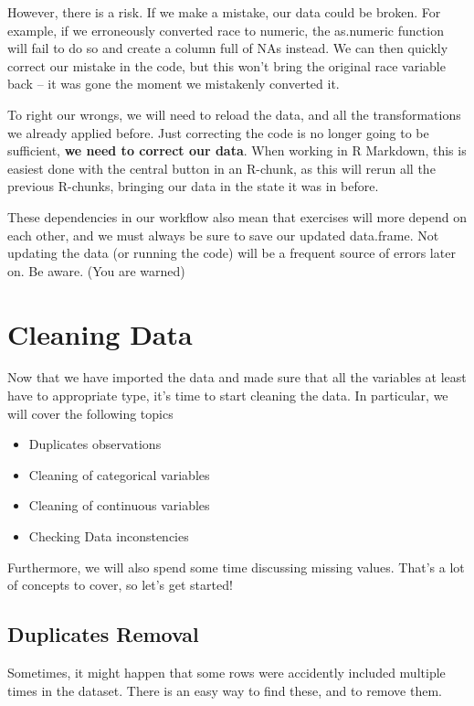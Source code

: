 \documentclass[]{tufte-book}
\providecommand{\tightlist}{%
  \setlength{\itemsep}{0pt}\setlength{\parskip}{0pt}}
\begin{document}
However, there is a risk. If we make a mistake, our data could be
broken. For example, if we erroneously converted race to numeric, the
as.numeric function will fail to do so and create a column full of NAs
instead. We can then quickly correct our mistake in the code, but this
won't bring the original race variable back -- it was gone the moment we
mistakenly converted it.

To right our wrongs, we will need to reload the data, and all the
transformations we already applied before. Just correcting the code is
no longer going to be sufficient, \textbf{we need to correct our data}.
When working in R Markdown, this is easiest done with the central button
in an R-chunk, as this will rerun all the previous R-chunks, bringing
our data in the state it was in before.

These dependencies in our workflow also mean that exercises will more
depend on each other, and we must always be sure to save our updated
data.frame. Not updating the data (or running the code) will be a
frequent source of errors later on. Be aware. (You are warned)

\chapter{Cleaning Data}\label{cleaning-data}

Now that we have imported the data and made sure that all the variables
at least have to appropriate type, it's time to start cleaning the data.
In particular, we will cover the following topics

\begin{itemize}
\tightlist
\item
  Duplicates observations
\item
  Cleaning of categorical variables
\item
  Cleaning of continuous variables
\item
  Checking Data inconstencies
\end{itemize}

Furthermore, we will also spend some time discussing missing values.
That's a lot of concepts to cover, so let's get started!

\section{Duplicates Removal}\label{duplicates-removal}

Sometimes, it might happen that some rows were accidently included
multiple times in the dataset. There is an easy way to find these, and
to remove them.
\end{document}
